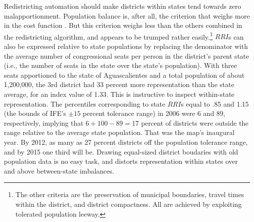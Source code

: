 \documentclass[letter,12pt]{article}
\begin{document}
Redistricting automation should make districts within states tend towards zero malapportionment. Population balance is, after all, the criterion that weighs more in the cost function \citep{altman.magar.mcd.trelles2014apsa}. But this criterion weighs less than the others combined in the redistricting algorithm, and appears to be trumped rather easily.\footnote{The other criteria are the preservation of municipal boundaries, travel times within the district, and district compactness. All are achieved by exploiting tolerated population leeway.} $RRI$s can also be expressed relative to state populations by replacing the denominator with the average number of congressional seats per person in the district's parent state (i.e., the number of seats in the state over the state's population). With three seats apportioned to the state of Aguascalientes and a total population of about 1,200,000, the 3rd district had 33 percent more representation than the state average, for an index value of 1.33. This is instructive to inspect within-state representation. The percentiles corresponding to state $RRI$s equal to .85 and 1.15 (the bounds of IFE's $\pm15$ percent tolerance range) in 2006 were 6 and 89, respectively, implying that $6+100-89=17$ percent of districts were outside the range relative to the average state population. That was the map's inaugural year. By 2012, as many as 27 percent districts off the population tolerance range, and by 2015 one third will be. Drawing equal-sized district boudaries with old population data is no easy task, and distorts representation within states over and above between-state imbalances.  
\end{document}
